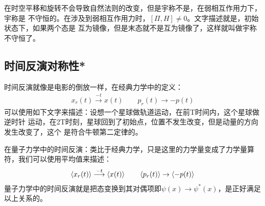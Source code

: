 \documentclass[UTF8]{article}
\numberwithin{equation}{section}
\begin{document}
在时空平移和旋转不会导致自然法则的改变，但是宇称不是，在弱相互作用力下，宇称是
不守恒的。在涉及到弱相互作用力时，$[\Pi,H]\neq 0$。文字描述就是，初始状态下，如果两个态是
互为镜像，但是末态就不是互为镜像了，这样就叫做宇称不守恒了。
\subsection{时间反演对称性*}
时间反演就像是电影的倒放一样，在经典力学中的定义：
\begin{align*}
    x_r(t)\stackrel{-t}{\longrightarrow} x(t)\qquad p_r(t)\rightarrow -p(t)
\end{align*}
可以使用如下文字来描述：设想一个星球做轨道运动，在前T时间内，这个星球做逆时针
运动，在2T时刻，星球回到了初始点，位置不发生改变，但是动量的方向发生改变了，这个
是符合牛顿第二定律的。

在量子力学中的时间反演：类比于经典力学，只是这里的力学量变成了力学量算符，我们可以使用平均值来描述：
\begin{align*}
    \expval{x_r(t)}\stackrel{-t}{\longrightarrow} \expval{x(t)}\qquad \expval{p_r(t)}\rightarrow \expval{-p(t)}
\end{align*}
量子力学中的时间反演就是把态变换到其对偶项即$\psi(x)\rightarrow \psi^*(x)$，是正好满足以上关系的。
\end{document}

